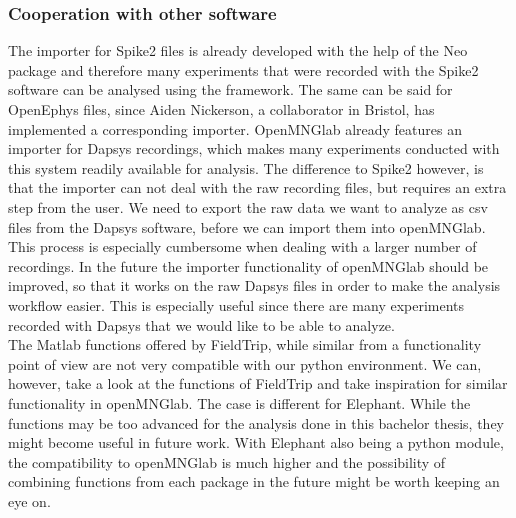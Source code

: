 \subsubsection{Cooperation with other software}
The importer for Spike2 files is already developed with the help of the Neo package and therefore many experiments that were recorded with the Spike2 software can be analysed using the framework. The same can be said for OpenEphys files, since Aiden Nickerson, a collaborator in Bristol, has implemented a corresponding importer.
OpenMNGlab already features an importer for Dapsys recordings, which makes many experiments conducted with this system readily available for analysis.
The difference to Spike2 however, is that the importer can not deal with the raw recording files, but requires an extra step from the user. We need to export the raw data we want to analyze as csv files from the Dapsys software, before we can import them into openMNGlab. This process is especially cumbersome when dealing with a larger number of recordings. In the future the importer functionality of openMNGlab should be improved, so that it works on the raw Dapsys files in order to make the analysis workflow easier. This is especially useful since there are many experiments recorded with Dapsys that we would like to be able to analyze.\\

The Matlab functions offered by FieldTrip, while similar from a functionality point of view are not very compatible with our python environment. We can, however, take a look at the functions of FieldTrip and take inspiration for similar functionality in openMNGlab.
The case is different for Elephant. While the functions may be too advanced for the analysis done in this bachelor thesis, they might become useful in future work.  With Elephant also being a python module, the compatibility to openMNGlab is much higher and the possibility of combining functions from each package in the future might be worth keeping an eye on. 

